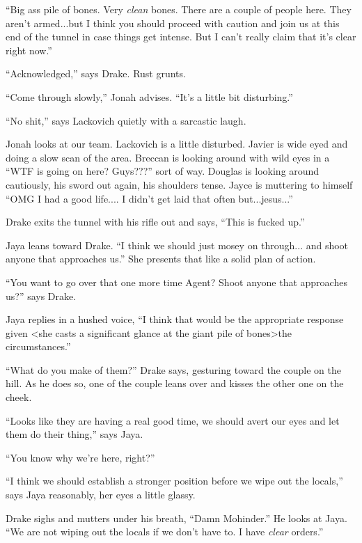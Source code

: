 ``Big ass pile of bones.  Very \textit{clean }bones. There are a couple of people here.  They aren't armed...but I think you should proceed with caution and join us at this end of the tunnel in case things get intense.  But I can't really claim that it's clear right now.''

``Acknowledged,'' says Drake. Rust grunts.

``Come through slowly,'' Jonah advises.  ``It's a little bit disturbing.''

``No shit,'' says Lackovich quietly with a sarcastic laugh.



Jonah looks at our team.  Lackovich is a little disturbed.  Javier is wide eyed and doing a slow scan of the area.  Breccan is looking around with wild eyes in a ``WTF is going on here?  Guys???'' sort of way.  Douglas is looking around cautiously, his sword out again, his shoulders tense.  Jayce is muttering to himself ``OMG I had a good life.... I didn't get laid that often but...jesus...''



Drake exits the tunnel with his rifle out and says, ``This is fucked up.''

Jaya leans toward Drake.  ``I think we should just mosey on through... and shoot anyone that approaches us.''  She presents that like a solid plan of action.

``You want to go over that one more time Agent?  Shoot anyone that approaches us?'' says Drake.

Jaya replies in a hushed voice, ``I think that would be the appropriate response given \textless she casts a significant glance at the giant pile of bones\textgreater  the circumstances.''

``What do you make of them?'' Drake says, gesturing toward the couple on the hill.  As he does so, one of the couple leans over and kisses the other one on the cheek.

``Looks like they are having a real good time, we should avert our eyes and let them do their thing,'' says Jaya.

``You know why we're here, right?''

``I think we should establish a stronger position before we wipe out the locals,'' says Jaya reasonably, her eyes a little glassy.

Drake sighs and mutters under his breath, ``Damn Mohinder.''  He looks at Jaya.  ``We are not wiping out the locals if we don't have to.  I have \textit{clear} orders.''

